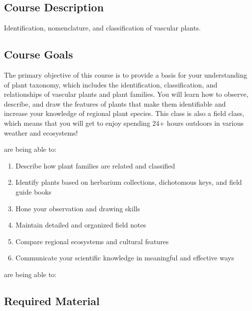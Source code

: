 \documentclass{tufte-handout}
\begin{document}
\begin{fullwidth}

\section{Course Description}

Identification, nomenclature, and classification of vascular plants. 

\subsection{Course Goals}

The primary objective of this course is to provide a basis for your understanding of plant taxonomy, which includes the identification, classification, and relationships of vascular plants and plant families. You will learn how to observe, describe, and draw the features of plants that make them identifiable and increase your knowledge of regional plant species. This class is also a field class, which means that you will get to enjoy spending 24+ hours outdoors in various weather and ecosystems!

 are being able to:

\begin{enumerate}
	\item Describe how plant families are related and classified
	\item Identify plants based on herbarium collections, dichotomous keys, and field guide books
	\item Hone your observation and drawing skills
	\item Maintain detailed and organized field notes
	\item Compare regional ecosystems and cultural features
	\item Communicate your scientific knowledge in meaningful and effective ways
\end{enumerate}

 are being able to: 

\vspace{1.5cm}

\subsection{Required Material}


\end{fullwidth}
\end{document}
